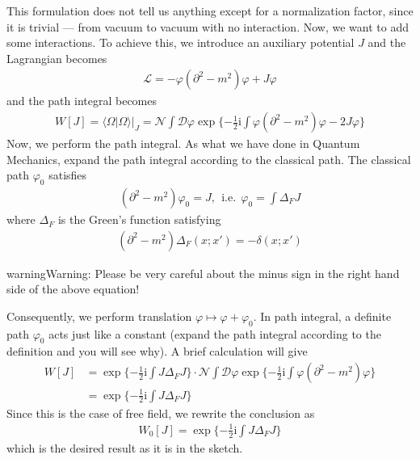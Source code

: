 \documentclass[letterpaper,10pt,english]{sphinxmanual}
\begin{document}
This formulation does not tell us anything except for a normalization factor, since it is trivial --- from vacuum to vacuum with no interaction. Now, we want to add some interactions. To achieve this, we introduce an auxiliary potential \(J\) and the Lagrangian becomes
\begin{equation*}
\begin{split}\mathcal{L} = -\varphi(\partial^2\!\!-\!m^2)\varphi + J\varphi\end{split}
\end{equation*}
and the path integral becomes
\begin{equation*}
\begin{split}W[J] = \langle\Omega|\Omega\rangle|_J = \mathcal{N}\int\mathcal{D}\varphi\exp\{-\frac{1}{2}\mathrm{i}\int\varphi(\partial^2\!\!-\!m^2)\varphi-2J\varphi\}\end{split}
\end{equation*}
Now, we perform the path integral. As what we have done in Quantum Mechanics, expand the path integral according to the classical path. The classical path \(\varphi_0\) satisfies
\begin{equation*}
\begin{split}(\partial^2\!\!-\!m^2)\varphi_0 = J,\ \ \text{i.e.}\ \ \varphi_0 = \int \Delta_F J\end{split}
\end{equation*}
where \(\Delta_F\) is the Green's function satisfying
\begin{equation*}
\begin{split}(\partial^2\!\!-\!m^2)\Delta_F(x;x') = -\delta(x;x')\end{split}
\end{equation*}
\begin{sphinxadmonition}{warning}{Warning:}
Please be very careful about the minus sign in the right hand side of the above equation!
\end{sphinxadmonition}

Consequently, we perform translation \(\varphi\mapsto\varphi + \varphi_0\). In path integral, a definite path \(\varphi_0\) acts just like a constant (expand the path integral according to the definition and you will see why). A brief calculation will give
\begin{equation*}
\begin{split}W[J] &= \exp\{-\frac{1}{2}\mathrm{i}\int J\Delta_F J\}\cdot \mathcal{N}\int\mathcal{D}\varphi\exp\{-\frac{1}{2}\mathrm{i}\int\varphi(\partial^2\!\!-\!m^2)\varphi\}\\
&= \exp\{-\frac{1}{2}\mathrm{i}\int J\Delta_F J\}\end{split}
\end{equation*}
Since this is the case of free field, we rewrite the conclusion as
\begin{equation*}
\begin{split}W_0[J] = \exp\{-\frac{1}{2}\mathrm{i}\int J\Delta_F J\}\end{split}
\end{equation*}
which is the desired result as it is in the sketch.
\end{document}
